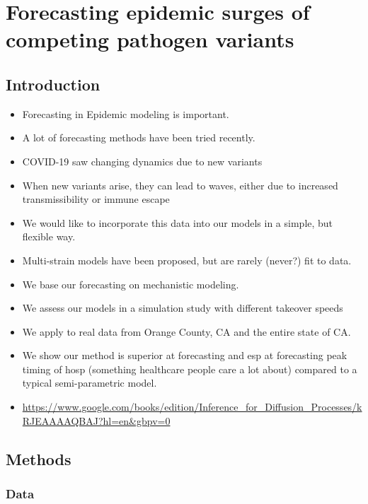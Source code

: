 \chapter{Forecasting epidemic surges of competing pathogen variants}
\graphicspath{{figures/ch_5/}}
\label{ch:content_3}

\section{Introduction}
\label{ch_5:sec:intro}

\begin{itemize}
    \item Forecasting in Epidemic modeling is important.
    \item A lot of forecasting methods have been tried recently.
    \item COVID-19 saw changing dynamics due to new variants
    \item When new variants arise, they can lead to waves, either due to increased transmissibility or immune escape
    \item We would like to incorporate this data into our models in a simple, but flexible way.
    \item Multi-strain models have been proposed, but are rarely (never?) fit to data.
    \item We base our forecasting on mechanistic modeling.
    \item We assess our models in a simulation study with different takeover speeds
    \item We apply to real data from Orange County, CA and the entire state of CA.
    \item We show our method is superior at forecasting and esp at forecasting peak timing of hosp (something healthcare people care a lot about) compared to a typical semi-parametric model.
    \item \url{https://www.google.com/books/edition/Inference_for_Diffusion_Processes/kRJEAAAAQBAJ?hl=en&gbpv=0}
\end{itemize}

\section{Methods}
\label{ch_5:sec:methods}

\subsection{Data}
\label{ch_5:subsec:data}

